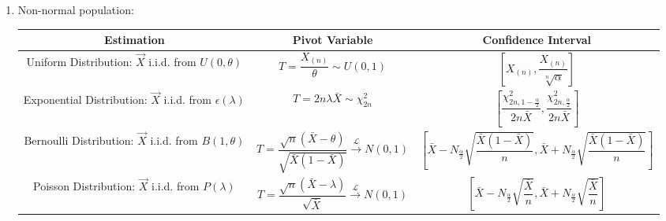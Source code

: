 \begin{enumerate}
        \item Non-normal population:%
        \begin{table}[H]
            \centering
            \renewcommand\arraystretch{2.2}
            \begin{tabular}{|c|c|c|}
                \hline
                Estimation& Pivot Variable & Confidence Interval\\
                \hline
                \makecell{Uniform Distribution: \\$\vec{X}$ i.i.d. from $U(0,\theta)$}&$T=\dfrac{X_{(n)}}{\theta}\sim U(0,1)$&$\left[X_{(n)},\dfrac{X_{(n)}}{\sqrt[n]{\alpha}}\right]$\\
                \hline
                \makecell{Exponential Distribution: \\$\vec{X}$ i.i.d. from $\epsilon(\lambda)$}&$T=2n\lambda\bar{X}\sim\chi^2_{2n}$&$\left[\dfrac{\chi_{2n,1-\frac{\alpha}{2}}^2}{2n\bar{X}},\dfrac{\chi_{2n,\frac{\alpha}{2}}^2}{2n\bar{X}}\right]$\\
                \hline
                \makecell{Bernoulli Distribution: \\$\vec{X}$ i.i.d. from $B(1,\theta)$}&$T=\dfrac{\sqrt{n}(\bar{X}-\theta)}{\sqrt{\bar{X}(1-\bar{X})}}\xrightarrow[]{\mathscr{L}}N(0,1)$&$\left[\bar{X}-N_{\frac{\alpha}{2}}\sqrt{\dfrac{\bar{X}(1-\bar{X})}{n}},\bar{X}+N_{\frac{\alpha}{2}}\sqrt{\dfrac{\bar{X}(1-\bar{X})}{n}}\right]$\\
                \hline
                \makecell{Poisson Distribution: \\$\vec{X}$ i.i.d. from $P(\lambda)$}&$T=\dfrac{\sqrt{n}(\bar
                X-\lambda)}{\sqrt{\bar{X}}}\xrightarrow[]{\mathscr{L}}N(0,1)$&$\left[\bar{X}-N_{\frac{\alpha}{2}}\sqrt{\dfrac{\bar{X}}{n}},\bar{X}+N_{\frac{\alpha}{2}}\sqrt{\dfrac{\bar{X}}{n}}\right]    $\\
                \hline
            \end{tabular}
        \end{table}
        
    
    

\end{enumerate}
